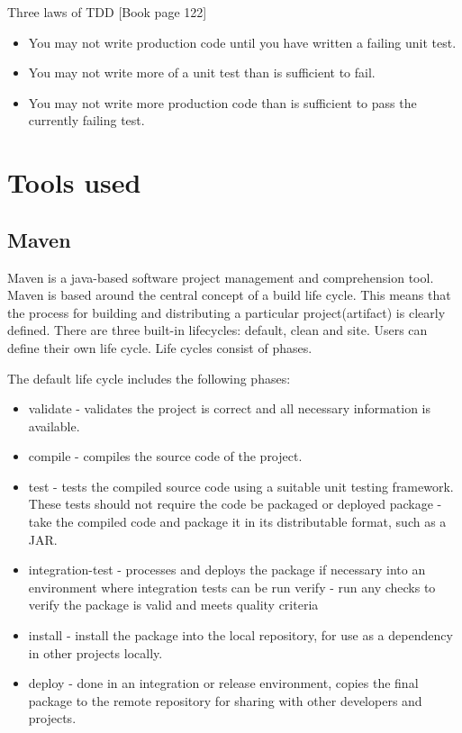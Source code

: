       Three laws of TDD \cite[pp122]{Cleancode}[Book page 122]
        \begin{itemize}
          \item You may not write production code until you have written a failing unit test.
          \item You may not write more of a unit test than is sufficient to fail.
          \item You may not write more production code than is sufficient to pass the currently failing test.
        \end{itemize}
        
  \section {Tools used}
  \label{sec:toolsused}
  
  \subsection{Maven}
  Maven is a java-based software project management and comprehension tool.
  Maven is based around the central concept of a build life cycle. This means
  that the process for building and distributing a particular project(artifact) is clearly defined. There are three built-in lifecycles:
  default, clean and site. Users can define their own life cycle. Life cycles
  consist of phases.
   
  The default life cycle includes the following phases:
  \begin{itemize}
    \item validate - validates the project is correct and all necessary
    information is available.
    \item compile - compiles the source code of the project.
    \item test - tests the compiled source code using a suitable unit testing
    framework. These tests should not require the code be packaged or deployed
    package - take the compiled code and package it in its distributable format,
    such as a JAR.
    \item integration-test - processes and deploys the package if necessary into
    an environment where integration tests can be run verify - run any checks to
    verify the package is valid and meets quality criteria
    \item install - install the package into the local repository, for use as a
      dependency in other projects locally.
    \item  deploy - done in an integration or
    release environment, copies the final package to the remote repository for
    sharing with other developers and projects.
  \end{itemize}
  
